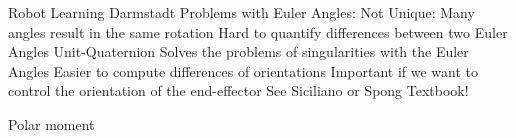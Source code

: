 \documentclass[12pt,a4paper,oneside]{article}
\begin{document}
\newpage

\listoffigures

\newpage


Robot Learning Darmstadt
Problems with Euler Angles:
Not Unique: Many angles result in the same rotation
Hard to quantify differences between two Euler Angles
Unit-Quaternion
Solves the problems of singularities with the Euler Angles
Easier to compute differences of orientations
Important if we want to control the orientation of the end-effector
See Siciliano or Spong Textbook!


Polar moment
\end{document}

